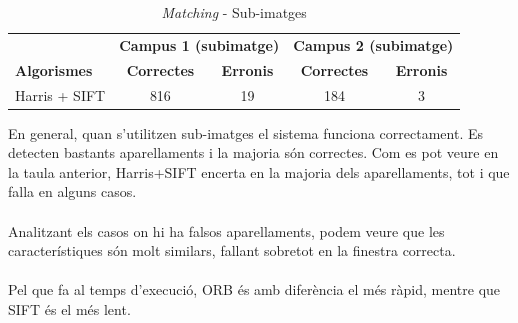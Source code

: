 		\begin{table}[H]
			\begin{center}
				\begin{tabular}{l | c c | c c}
					& \multicolumn{2}{c|}{\textbf{Campus 1 (subimatge)}} & \multicolumn{2}{c}{\textbf{Campus 2 (subimatge)}} \\
					\textbf{Algorismes} & \textbf{Correctes} & \textbf{Erronis} & \textbf{Correctes} & \textbf{Erronis} \\ \hline
					Harris + SIFT & 816 & 19 & 184 & 3 \\
				\end{tabular}
			\end{center}
			\caption{\textit{Matching} - Sub-imatges}
		\end{table}

		\noindent
		En general, quan s'utilitzen sub-imatges el sistema funciona correctament. Es detecten bastants aparellaments i la majoria són correctes. Com es pot veure en la taula anterior,
		Harris+SIFT encerta en la majoria dels aparellaments, tot i que falla en alguns casos.\\\\
		Analitzant els casos on hi ha falsos aparellaments, podem veure que les característiques són molt similars, fallant sobretot en la finestra correcta.\\\\
		Pel que fa al temps d'execució, ORB és amb diferència el més ràpid, mentre que SIFT és el més lent.\\

